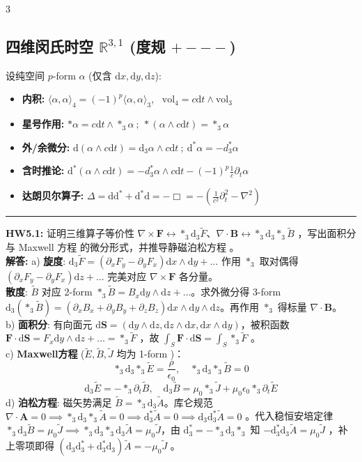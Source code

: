 \documentclass[9pt,a4paper]{article} %
\newcommand{\p}{\partial}
\newcommand{\diff}{\mathrm{d}}
\newcommand{\mbf}[1]{\mathbf{#1}}
\begin{document}
\begin{multicols*}{3}
\subsection*{四维闵氏时空 $\mathbb{R}^{3,1}$ (度规 $+ - - -$)}
设纯空间 $p$-form $\alpha$ (仅含 $\diff x, \diff y, \diff z$):
\begin{itemize}
    \item \textbf{内积:} $\langle \alpha, \alpha \rangle_4 = (-1)^p \langle \alpha, \alpha \rangle_3$, \ $\text{vol}_4 = c\diff t \wedge \text{vol}_3$
    \item \textbf{星号作用:} $*\alpha = c\diff t \wedge *_3\alpha \ ; \ *(\alpha \wedge c\diff t) = *_3\alpha$
    \item \textbf{外/余微分:} $\diff(\alpha \wedge c\diff t) = \diff_3\alpha \wedge c\diff t \ ; \ \diff^*\alpha = -d_3^*\alpha$
    \item \textbf{含时推论:} $\diff^*(\alpha \wedge c\diff t) = -d_3^*\alpha \wedge c\diff t - (-1)^p\frac{1}{c}\p_t\alpha$
    \item \textbf{达朗贝尔算子:} $\Delta = \diff\diff^* + \diff^*\diff = -\Box = -(\frac{1}{c^2}\p_t^2 - \nabla^2)$
\end{itemize}

\vspace{1ex}\hrule\vspace{1ex}
\noindent\textbf{HW5.1:} 证明三维算子等价性 $\nabla \times \mbf{F} \leftrightarrow *_3 \diff_3 \tilde{F}$、$\nabla \cdot \mbf{B} \leftrightarrow *_3\diff_3*_3\tilde{B}$ ，写出面积分 与 Maxwell 方程 的微分形式，并推导静磁泊松方程 。\\
\textbf{解答:} a) \textbf{旋度}: $\diff_3 \tilde{F} = (\p_x F_y - \p_y F_x)\diff x \wedge \diff y + \dots$ 作用 $*_3$ 取对偶得 $(\p_x F_y - \p_y F_x)\diff z + \dots$ 完美对应 $\nabla \times \mbf{F}$ 各分量。\\
\textbf{散度}: $\tilde{B}$ 对应 2-form $*_3\tilde{B} = B_x \diff y \wedge \diff z + \dots$。求外微分得 3-form $\diff_3(*_3\tilde{B}) = (\p_x B_x + \p_y B_y + \p_z B_z)\diff x \wedge \diff y \wedge \diff z$。再作用 $*_3$ 得标量 $\nabla \cdot \mbf{B}$。\\
b) \textbf{面积分}: 有向面元 $\diff\mbf{S} = (\diff y\wedge\diff z, \diff z\wedge\diff x, \diff x\wedge\diff y)$，被积函数 $\mbf{F}\cdot\diff\mbf{S} = F_x \diff y\wedge\diff z + \dots = *_3 \tilde{F}$ ，故 $\int_{S}\mbf{F}\cdot \diff\mbf{S}=\int_{S}*_3 \tilde{F}$ 。\\
c) \textbf{Maxwell方程} ($\tilde{E}, \tilde{B}, \tilde{J}$ 均为 1-form )：
$$*_3\diff_3*_3\tilde{E} = \frac{\rho}{\epsilon_0}, \quad *_3\diff_3*_3\tilde{B} = 0$$
$$ \diff_3 \tilde{E} = -*_3 \p_t \tilde{B}, \quad \diff_3 \tilde{B} = \mu_0 *_3 \tilde{J} + \mu_0\epsilon_0 *_3 \p_t \tilde{E}$$
d) \textbf{泊松方程}: 磁矢势满足 $\tilde{B} = *_3 \diff_3 \tilde{A}$。库仑规范 $\nabla\cdot\mbf{A}=0 \implies *_3\diff_3*_3\tilde{A} = 0 \implies \diff_3^* \tilde{A} = 0 \implies \diff_3\diff_3^* \tilde{A} = 0$ 。代入稳恒安培定律 $*_3\diff_3\tilde{B} = \mu_0\tilde{J} \implies *_3\diff_3*_3\diff_3\tilde{A} = \mu_0\tilde{J}$，由 $\diff_3^* = -*_3\diff_3*_3$ 知 $-\diff_3^* \diff_3\tilde{A} = \mu_0\tilde{J}$ ，补上零项即得 $(\diff_3\diff_3^* + \diff_3^*\diff_3)\tilde{A} = -\mu_0\tilde{J}$ 。


\end{multicols*}
\end{document}
